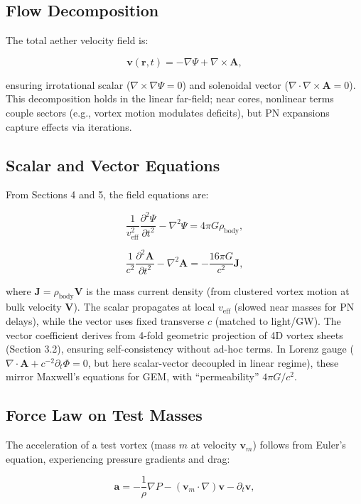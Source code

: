 \documentclass{article}
\begin{document}
\subsection{Flow Decomposition}

The total aether velocity field is:

\[
\mathbf{v}(\mathbf{r}, t) = -\nabla \Psi + \nabla \times \mathbf{A},
\]

ensuring irrotational scalar ($\nabla \times \nabla \Psi = 0$) and solenoidal vector ($\nabla \cdot \nabla \times \mathbf{A} = 0$). This decomposition holds in the linear far-field; near cores, nonlinear terms couple sectors (e.g., vortex motion modulates deficits), but PN expansions capture effects via iterations.

\subsection{Scalar and Vector Equations}

From Sections 4 and 5, the field equations are:

\[
\frac{1}{v_{\text{eff}}^2} \frac{\partial^2 \Psi}{\partial t^2} - \nabla^2 \Psi = 4\pi G \rho_{\text{body}},
\]

\[
\frac{1}{c^2} \frac{\partial^2 \mathbf{A}}{\partial t^2} - \nabla^2 \mathbf{A} = -\frac{16\pi G}{c^2} \mathbf{J},
\]

where $\mathbf{J} = \rho_{\text{body}} \mathbf{V}$ is the mass current density (from clustered vortex motion at bulk velocity $\mathbf{V}$). The scalar propagates at local $v_{\text{eff}}$ (slowed near masses for PN delays), while the vector uses fixed transverse $c$ (matched to light/GW). The vector coefficient derives from 4-fold geometric projection of 4D vortex sheets (Section 3.2), ensuring self-consistency without ad-hoc terms. In Lorenz gauge ($\nabla \cdot \mathbf{A} + c^{-2} \partial_t \Phi = 0$, but here scalar-vector decoupled in linear regime), these mirror Maxwell's equations for GEM, with ``permeability'' $4\pi G / c^2$.

\subsection{Force Law on Test Masses}

The acceleration of a test vortex (mass $m$ at velocity $\mathbf{v}_m$) follows from Euler's equation, experiencing pressure gradients and drag:

\[
\mathbf{a} = -\frac{1}{\rho} \nabla P - (\mathbf{v}_m \cdot \nabla) \mathbf{v} - \partial_t \mathbf{v},
\]
\end{document}
